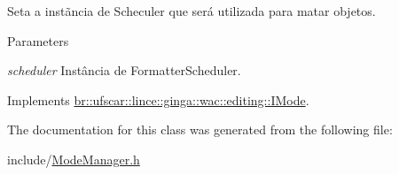 Seta a instãncia de Scheculer que será utilizada para matar objetos. 


\begin{DoxyParams}{Parameters}
\item[{\em scheduler}]Instância de FormatterScheduler. \end{DoxyParams}


Implements \hyperlink{classbr_1_1ufscar_1_1lince_1_1ginga_1_1wac_1_1editing_1_1IMode_a5048bc35fa6ade1b514f79467519b52f}{br::ufscar::lince::ginga::wac::editing::IMode}.



The documentation for this class was generated from the following file:\begin{DoxyCompactItemize}
\item 
include/\hyperlink{ModeManager_8h}{ModeManager.h}\end{DoxyCompactItemize}
